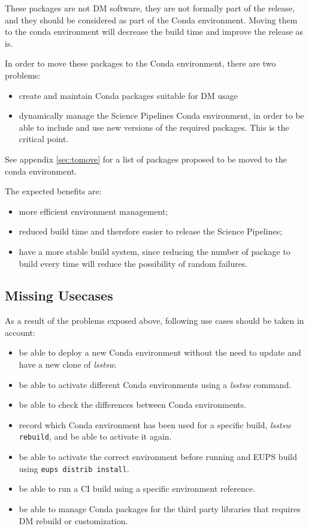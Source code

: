 These packages are not DM software, they are not formally part of the release, and they should be considered as part of the Conda environment.
Moving them to the conda environment will decrease the build time and improve the release as is.

In order to move these packages to the Conda environment, there are two problems:

\begin{itemize}
\item create and maintain Conda packages suitable for DM usage
\item dynamically manage the Science Pipelines Conda environment, in order to be able to include and use new versions of the required packages. This is the critical point.
\end{itemize}

See appendix \ref{sec:tomove} for a list of packages proposed to be moved to the conda environment.

The expected benefits are:

\begin{itemize}
\item more efficient environment management;
\item reduced build time and therefore easier to release the Science Pipelines;
\item have a more stable build system, since reducing the number of package to build every time will reduce the possibility of random failures.
\end{itemize}


\subsection{Missing Usecases}

As a result of the problems exposed above, following use cases should be taken in account:

\begin{itemize}
\item be able to deploy a new Conda environment without the need to update and have a new clone of \textit{lsstsw}.
\item be able to activate different Conda environments using a \textit{lsstsw} command.
\item be able to check the differences between Conda environments.
\item record which Conda environment has been used for a specific build, \textit{lsstsw} \texttt{rebuild}, and be able to activate it again.
\item be able to activate the correct environment before running and EUPS build using \texttt{eups distrib install}.
\item be able to run a CI build using a specific environment reference.
\item be able to manage Conda packages for the third party libraries that requires DM rebuild or customization.
\end{itemize}



